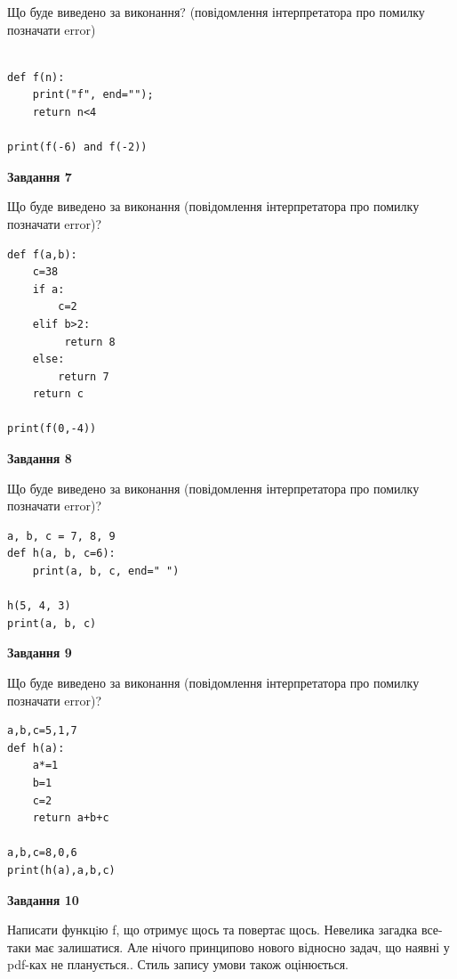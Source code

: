 \documentclass[12pt, ukrainian]{article}
\begin{document}
{\begin {large}
Що буде виведено за виконання? (повідомлення інтерпретатора про помилку позначати error)\par
\begin{verbatim}

def f(n):
    print("f", end="");
    return n<4

print(f(-6) and f(-2))
\end{verbatim}

{\begin {center}\textbf{Завдання 7}\end {center}}

Що буде виведено за виконання (повідомлення інтерпретатора про помилку позначати error)?\par
\begin{verbatim}
def f(a,b):
    c=38
    if a:
        c=2
    elif b>2:
         return 8
    else: 
        return 7
    return c

print(f(0,-4))
\end{verbatim}

{\begin {center}\textbf{Завдання 8}\end {center}}

Що буде виведено за виконання (повідомлення інтерпретатора про помилку позначати error)?\par
\begin{verbatim}
a, b, c = 7, 8, 9
def h(a, b, c=6):
    print(a, b, c, end=" ")

h(5, 4, 3)
print(a, b, c)
\end{verbatim}

{\begin {center}\textbf{Завдання 9}\end {center}}

Що буде виведено за виконання (повідомлення інтерпретатора про помилку позначати error)?\par
\begin{verbatim}
a,b,c=5,1,7
def h(a):
    a*=1
    b=1
    c=2
    return a+b+c

a,b,c=8,0,6
print(h(a),a,b,c)
\end{verbatim}

{\begin {center}\textbf{Завдання 10}\end {center}}


Написати функцiю f, що отримує щось та повертає щось. Невелика загадка все-таки має залишатися. Але нічого принципово нового відносно задач, що наявні у pdf-ках не планується.. Стиль запису умови також оцінюється.\par
\end {large}}
\newpage
\end{document}
